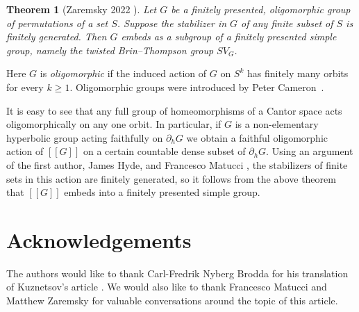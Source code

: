 \documentclass[usenames,dvipsnames]{amsart}
\newtheorem{theorem}{Theorem}[section]
\theoremstyle{definition}
\begin{document}
\begin{theorem}[Zaremsky 2022 \cite{zaremskyTaste}]
Let $G$ be a finitely presented, oligomorphic group of permutations of a set $S$. Suppose the stabilizer in $G$ of any finite subset of $S$ is finitely generated. Then
$G$ embeds as a subgroup of a finitely presented simple group, namely the twisted Brin–Thompson group $SV_G$.
\end{theorem}

Here $G$ is \textit{oligomorphic} if the induced action of $G$ on $S^k$ has finitely many orbits for every $k\geq 1$.  Oligomorphic groups were introduced by Peter Cameron~\cite{CameronOligomorphic}.

It is easy to see that any full group of homeomorphisms of a Cantor space acts oligomorphically on any one orbit.  In particular, if $G$ is a non-elementary hyperbolic group acting faithfully on $\partial_h G$ we obtain a faithful oligomorphic action of $[[G]]$ on a certain countable dense subset of $\partial_h G$. 
 Using an argument of the first author, James Hyde, and Francesco Matucci \cite{Belk-Hyde-Matucci-2}, the stabilizers of finite sets in this action are finitely generated, so it follows from the above theorem that $[[G]]$ embeds into a finitely presented simple group.

\section{Acknowledgements}
The authors would like to thank Carl-Fredrik Nyberg Brodda for his translation of Kuznetsov's article \cite{Kuznetsov}.  We would also like to thank Francesco Matucci and Matthew Zaremsky for valuable conversations around the topic of this article. 



 
\end{document}
